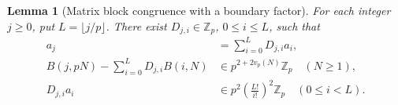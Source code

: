 \documentclass[11pt,a4paper]{article}
\newtheorem{lemma}[theorem]{Lemma}
\theoremstyle{definition}\newtheorem{definition}[theorem]{Definition}
\theoremstyle{remark}\newtheorem{remark}[theorem]{Remark}
\numberwithin{equation}{section}
\begin{document}
\begin{lemma}[Matrix block congruence with a boundary factor]
\label{P:lem:octa-matrix-block}
For each integer \(j\geq0\), put \(L=\lfloor j/p\rfloor\).
There exist \(D_{j,i}\in\mathbb Z_p\), \(0\leq i\leq L\),
such that
\begin{align}
 a_j&=\sum_{i=0}^{L}D_{j,i}a_i,
                    \label{P:eq:octa-central-exact}\\
 B(j,pN)-\sum_{i=0}^{L}D_{j,i}B(i,N)
    &\in p^{2+2v_p(N)}\mathbb Z_p\quad(N\geq1),
                    \label{P:eq:octa-row-block}\\
 D_{j,i}a_i&\in
       p^2\left(\frac{L!}{i!}\right)^2\mathbb Z_p
              \quad(0\leq i<L).
                    \label{P:eq:octa-row-boundary}
\end{align}
\end{lemma}
\end{document}
